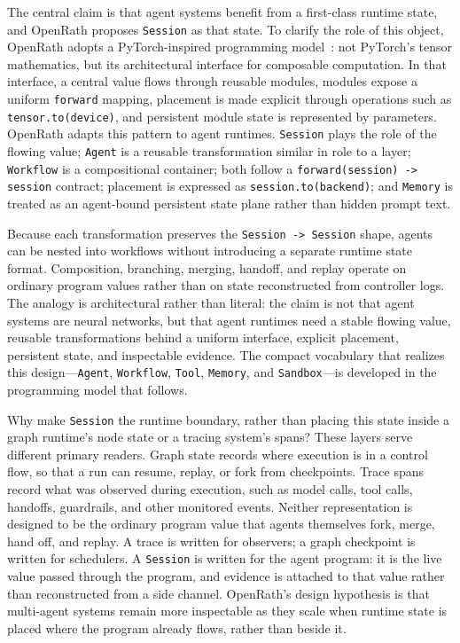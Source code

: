 
The central claim is that agent systems benefit from a first-class runtime state, and OpenRath proposes \texttt{Session} as that state. To clarify the role of this object, OpenRath adopts a PyTorch-inspired programming model~\cite{pytorch}: not PyTorch's tensor mathematics, but its architectural interface for composable computation. In that interface, a central value flows through reusable modules, modules expose a uniform \texttt{forward} mapping, placement is made explicit through operations such as \texttt{tensor.to(device)}, and persistent module state is represented by parameters. OpenRath adapts this pattern to agent runtimes. \texttt{Session} plays the role of the flowing value; \texttt{Agent} is a reusable transformation similar in role to a layer; \texttt{Workflow} is a compositional container; both follow a \texttt{forward(session) -> session} contract; placement is expressed as \texttt{session.to(backend)}; and \texttt{Memory} is treated as an agent-bound persistent state plane rather than hidden prompt text.

Because each transformation preserves the \texttt{Session -> Session} shape, agents can be nested into workflows without introducing a separate runtime state format. Composition, branching, merging, handoff, and replay operate on ordinary program values rather than on state reconstructed from controller logs. The analogy is architectural rather than literal: the claim is not that agent systems are neural networks, but that agent runtimes need a stable flowing value, reusable transformations behind a uniform interface, explicit placement, persistent state, and inspectable evidence. The compact vocabulary that realizes this design---\texttt{Agent}, \texttt{Workflow}, \texttt{Tool}, \texttt{Memory}, and \texttt{Sandbox}---is developed in the programming model that follows.

Why make \texttt{Session} the runtime boundary, rather than placing this state inside a graph runtime's node state or a tracing system's spans? These layers serve different primary readers. Graph state records where execution is in a control flow, so that a run can resume, replay, or fork from checkpoints. Trace spans record what was observed during execution, such as model calls, tool calls, handoffs, guardrails, and other monitored events. Neither representation is designed to be the ordinary program value that agents themselves fork, merge, hand off, and replay. A trace is written for observers; a graph checkpoint is written for schedulers. A \texttt{Session} is written for the agent program: it is the live value passed through the program, and evidence is attached to that value rather than reconstructed from a side channel. OpenRath's design hypothesis is that multi-agent systems remain more inspectable as they scale when runtime state is placed where the program already flows, rather than beside it.

